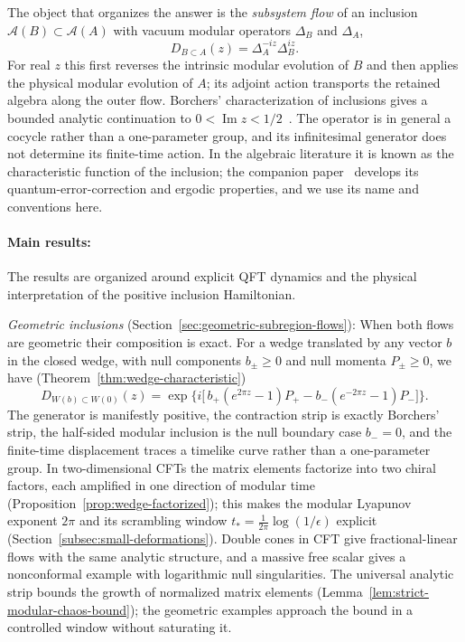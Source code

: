 \documentclass[a4paper,11pt]{article}
\theoremstyle{definition}
\begin{document}
The object that organizes the answer is the \emph{subsystem flow} of an inclusion $\mathcal A(B)\subset\mathcal A(A)$ with vacuum modular operators $\Delta_B$ and $\Delta_A$,
\begin{equation}
 D_{B\subset A}(z)=\Delta_A^{-iz}\Delta_B^{iz}.
 \label{eq:intro-D}
\end{equation}
For real $z$ this first reverses the intrinsic modular evolution of $B$ and then applies the physical modular evolution of $A$; its adjoint action transports the retained algebra along the outer flow. Borchers' characterization of inclusions gives a bounded analytic continuation to $0<\operatorname{Im}z<1/2$~\cite{revolutionizing}. The operator is in general a cocycle rather than a one-parameter group, and its infinitesimal generator does not determine its finite-time action. In the algebraic literature it is known as the characteristic function of the inclusion; the companion paper~\cite{companionQEC} develops its quantum-error-correction and ergodic properties, and we use its name and conventions here.

\paragraph{Main results:}
The results are organized around explicit QFT dynamics and the physical interpretation of the positive inclusion Hamiltonian.

\emph{Geometric inclusions} (Section~\ref{sec:geometric-subregion-flows}): When both flows are geometric their composition is exact. For a wedge translated by any vector $b$ in the closed wedge, with null components $b_\pm\ge0$ and null momenta $P_\pm\ge0$, we have (Theorem~\ref{thm:wedge-characteristic})
\begin{equation}
 D_{W(b)\subset W(0)}(z)=\exp\Big\{i\big[\,b_+(e^{2\pi z}-1)P_+-b_-(e^{-2\pi z}-1)P_-\big]\Big\}.
 \label{eq:intro-wedge}
\end{equation}
The generator is manifestly positive, the contraction strip is exactly Borchers' strip, the half-sided modular inclusion is the null boundary case $b_-=0$, and the finite-time displacement traces a timelike curve rather than a one-parameter group. In two-dimensional CFTs the matrix elements factorize into two chiral factors, each amplified in one direction of modular time (Proposition~\ref{prop:wedge-factorized}); this makes the modular Lyapunov exponent $2\pi$ and its scrambling window $t_*=\tfrac1{2\pi}\log(1/\epsilon)$ explicit (Section~\ref{subsec:small-deformations}). Double cones in CFT give fractional-linear flows with the same analytic structure, and a massive free scalar gives a nonconformal example with logarithmic null singularities. The universal analytic strip bounds the growth of normalized matrix elements (Lemma~\ref{lem:strict-modular-chaos-bound}); the geometric examples approach the bound in a controlled window without saturating it.
\end{document}
